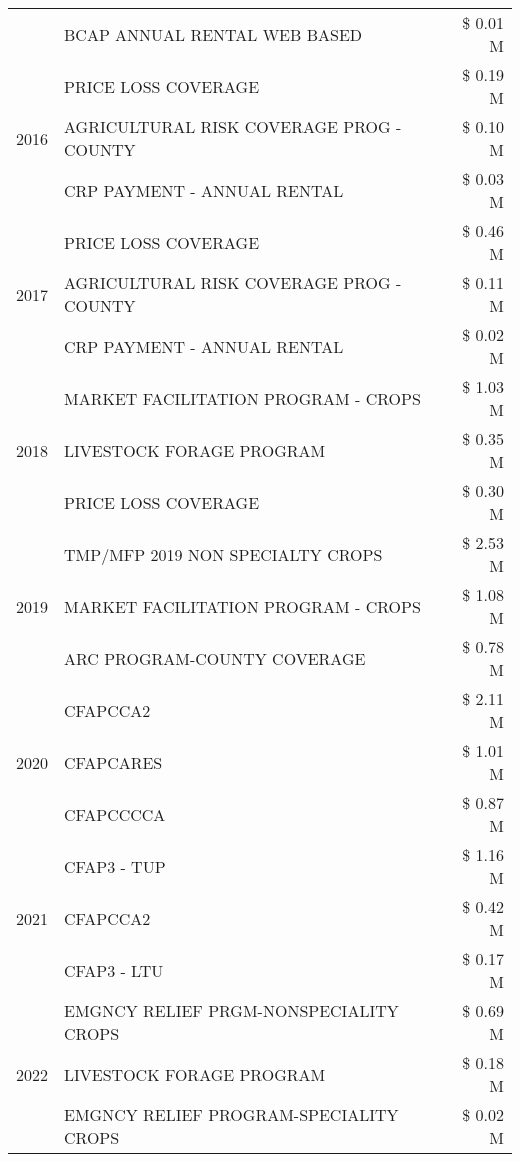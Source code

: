 \begin{tabular}{llr}
 & BCAP ANNUAL RENTAL WEB BASED & \$ 0.01 M \\
\cline{1-3}
\multirow[t]{3}{*}{2016} & PRICE LOSS COVERAGE & \$ 0.19 M \\
 & AGRICULTURAL RISK COVERAGE PROG - COUNTY & \$ 0.10 M \\
 & CRP PAYMENT - ANNUAL RENTAL & \$ 0.03 M \\
\cline{1-3}
\multirow[t]{3}{*}{2017} & PRICE LOSS COVERAGE & \$ 0.46 M \\
 & AGRICULTURAL RISK COVERAGE PROG - COUNTY & \$ 0.11 M \\
 & CRP PAYMENT - ANNUAL RENTAL & \$ 0.02 M \\
\cline{1-3}
\multirow[t]{3}{*}{2018} & MARKET FACILITATION PROGRAM - CROPS & \$ 1.03 M \\
 & LIVESTOCK FORAGE PROGRAM & \$ 0.35 M \\
 & PRICE LOSS COVERAGE & \$ 0.30 M \\
\cline{1-3}
\multirow[t]{3}{*}{2019} & TMP/MFP 2019 NON SPECIALTY CROPS & \$ 2.53 M \\
 & MARKET FACILITATION PROGRAM - CROPS & \$ 1.08 M \\
 & ARC PROGRAM-COUNTY COVERAGE & \$ 0.78 M \\
\cline{1-3}
\multirow[t]{3}{*}{2020} & CFAPCCA2 & \$ 2.11 M \\
 & CFAPCARES & \$ 1.01 M \\
 & CFAPCCCCA & \$ 0.87 M \\
\cline{1-3}
\multirow[t]{3}{*}{2021} & CFAP3 - TUP & \$ 1.16 M \\
 & CFAPCCA2 & \$ 0.42 M \\
 & CFAP3 - LTU & \$ 0.17 M \\
\cline{1-3}
\multirow[t]{3}{*}{2022} & EMGNCY RELIEF PRGM-NONSPECIALITY CROPS & \$ 0.69 M \\
 & LIVESTOCK FORAGE PROGRAM & \$ 0.18 M \\
 & EMGNCY RELIEF PROGRAM-SPECIALITY CROPS & \$ 0.02 M \\
\cline{1-3}
\bottomrule
\end{tabular}
